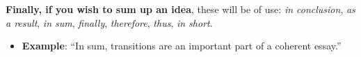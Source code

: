 \textbf{Finally, if you wish to sum up an idea}, these will be of use: \emph{in conclusion}, \emph{as a result}, \emph{in sum}, \emph{finally}, \emph{therefore}, \emph{thus}, \emph{in short}.

\begin{itemize}
	\item  \textbf{Example}: ``In sum, transitions are an important part of a coherent essay.''
\end{itemize}



